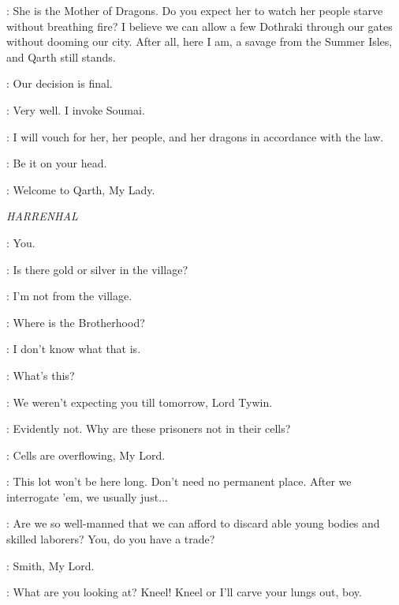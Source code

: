 \XARO: She is the Mother of Dragons. Do you expect her to watch her people starve without breathing fire? I believe we can allow a few Dothraki through our gates without dooming our city. After all, here I am, a savage from the Summer Isles, and Qarth still stands. 

\SPICEKING: Our decision is final. 

\XARO: Very well. I invoke Soumai. 


\XARO: I will vouch for her, her people, and her dragons in accordance with the law. 

\SPICEKING: Be it on your head. 

\XARO: Welcome to Qarth, My Lady. 



\scene

\textit{HARRENHAL} 


\MOUNTAIN: You. 


\TICKLER: Is there gold or silver in the village? 

\GENDRY: I'm not from the village. 

\TICKLER: Where is the Brotherhood? 

\GENDRY: I don't know what that is. 


\TYWIN: What's this? 

\MOUNTAIN: We weren't expecting you till tomorrow, Lord Tywin. 

\TYWIN: Evidently not. Why are these prisoners not in their cells? 

\MOUNTAIN: Cells are overflowing, My Lord. 

\POLLIVER: This lot won't be here long. Don't need no permanent place. After we interrogate 'em, we usually just$\ldots$ 

\TYWIN: Are we so well-manned that we can afford to discard able young bodies and skilled laborers? You, do you have a trade? 

\GENDRY: Smith, My Lord. 

\POLLIVER:  What are you looking at? Kneel! Kneel or I'll carve your lungs out, boy. 

